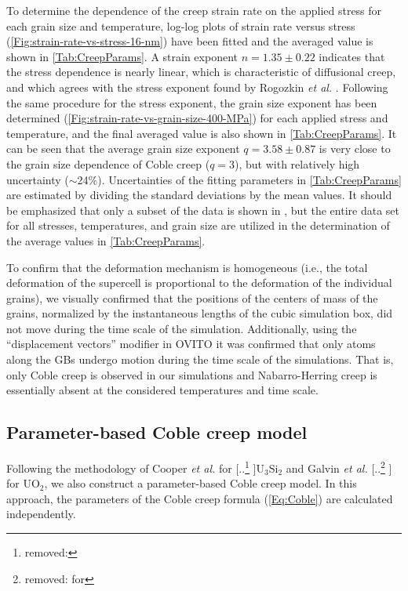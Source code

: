 \documentclass[preprint,12pt,sort&compress]{elsarticle} %
\newcommand{\?}{\stackrel{?}{=}}
\providecommand{\DIFaddtex}[1]{{\sf #1}} %
\providecommand{\DIFdeltex}[1]{{[..\footnote{removed: #1} ]}} %
\providecommand{\DIFaddbegin}{\protect\color{blue}} %
\providecommand{\DIFaddend}{\protect\color{black}} %
\providecommand{\DIFdelbegin}{\protect\color{red}} %
\providecommand{\DIFdelend}{\protect\color{black}} %
\providecommand{\DIFadd}[1]{\texorpdfstring{\DIFaddtex{#1}}{#1}} %
\providecommand{\DIFdel}[1]{\texorpdfstring{\DIFdeltex{#1}}{}} %
\newcommand{\DIFscaledelfig}{0.5}
\newlength{\DIFdelgraphicswidth} %
\newlength{\DIFdelgraphicsheight} %
\newcommand{\DIFaddincludegraphics}[2][]{{\color{blue}\fbox{\DIFOincludegraphics[#1]{#2}}}} %
\newcommand{\DIFdelincludegraphics}[2][]{%
\sbox{\DIFdelgraphicsbox}{\DIFOincludegraphics[#1]{#2}}%
\settoboxwidth{\DIFdelgraphicswidth}{\DIFdelgraphicsbox} %
\settoboxtotalheight{\DIFdelgraphicsheight}{\DIFdelgraphicsbox} %
\scalebox{\DIFscaledelfig}{%
\parbox[b]{\DIFdelgraphicswidth}{\usebox{\DIFdelgraphicsbox}\\[-\baselineskip] \rule{\DIFdelgraphicswidth}{0em}}\llap{\resizebox{\DIFdelgraphicswidth}{\DIFdelgraphicsheight}{%
\setlength{\unitlength}{\DIFdelgraphicswidth}%
\begin{picture}(1,1)%
\thicklines\linethickness{2pt} %
{\color[rgb]{1,0,0}\put(0,0){\framebox(1,1){}}}%
{\color[rgb]{1,0,0}\put(0,0){\line( 1,1){1}}}%
{\color[rgb]{1,0,0}\put(0,1){\line(1,-1){1}}}%
\end{picture}%
}\hspace*{3pt}}} %
} %
\DeclareRobustCommand{\DIFaddbegin}{\DIFOaddbegin \let\includegraphics\DIFaddincludegraphics} %
\DeclareRobustCommand{\DIFaddend}{\DIFOaddend \let\includegraphics\DIFOincludegraphics} %
\DeclareRobustCommand{\DIFdelbegin}{\DIFOdelbegin \let\includegraphics\DIFdelincludegraphics} %
\DeclareRobustCommand{\DIFdelend}{\DIFOaddend \let\includegraphics\DIFOincludegraphics} %
\begin{document}
To determine the dependence of the creep strain rate on the applied stress for each grain size and temperature, log-log plots of strain rate versus stress (\cref{Fig:strain-rate-vs-stress-16-nm}) have been fitted and the averaged value is shown in \cref{Tab:CreepParams}. A strain exponent $n = 1.35 \pm 0.22$ indicates that the stress dependence is nearly linear, which is characteristic of diffusional creep, and which agrees with the stress exponent found by Rogozkin \textit{et al.} \cite{Rogozkin2003}. Following the same procedure for the stress exponent, the grain size exponent has been determined (\cref{Fig:strain-rate-vs-grain-size-400-MPa}) for each applied stress and temperature, and the final averaged value is also shown in \cref{Tab:CreepParams}. It can be seen that the average grain size exponent $q = 3.58 \pm 0.87$ is very close to the grain size dependence of Coble creep ($q = 3$), but with relatively high uncertainty ($\sim$24\%). Uncertainties of the fitting parameters in \cref{Tab:CreepParams} are estimated by dividing the standard deviations by the mean values. It should be emphasized that only a subset of the data is shown in , but the entire data set for all stresses, temperatures, and grain size are utilized in the determination of the average values in \cref{Tab:CreepParams}.

To confirm that the deformation mechanism is homogeneous (i.e., the total deformation of the supercell is proportional to the deformation of the individual grains), we visually confirmed that the positions of the centers of mass of the grains, normalized by the instantaneous lengths of the cubic simulation box, did not move during the time scale of the simulation. Additionally, using the ``displacement vectors'' modifier in OVITO \cite{Stukowski2010} it was confirmed that only atoms along the GBs undergo motion during the time scale of the simulations. That is, only Coble creep is observed in our simulations and Nabarro-Herring creep is essentially absent at the considered temperatures and time scale.

\subsection{Parameter-based Coble creep model}
\label{Sec:ParameterBased}

Following the methodology of Cooper \textit{et al.} \cite{Cooper2021} for \DIFdelbegin \DIFdel{ }\DIFdelend \DIFaddbegin \DIFadd{U$_3$Si$_2$ }\DIFaddend and Galvin \textit{et al.} \DIFdelbegin \DIFdel{\cite{Galvin2024b} for }\DIFdelend \DIFaddbegin \DIFadd{\cite{Galvin2025} for UO$_2$}\DIFaddend , we also construct a parameter-based Coble creep model. In this approach, the parameters of the Coble creep formula (\cref{Eq:Coble}) are calculated independently. 
\end{document}
